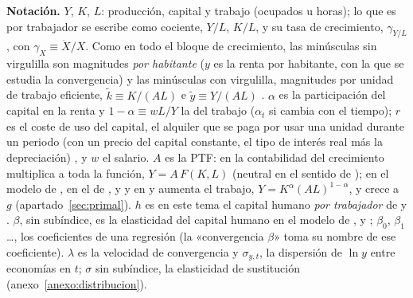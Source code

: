 \documentclass[11pt]{article}
\begin{document}
\begin{anotaciones}
\textbf{Notación.} $Y$, $K$, $L$: producción, capital y trabajo (ocupados u horas); lo que es por trabajador se escribe como cociente, $Y/L$, $K/L$, y su tasa de crecimiento, $\gamma_{Y/L}$, con $\gamma_X\equiv\dot X/X$. Como en todo el bloque de crecimiento, las minúsculas sin virgulilla son magnitudes \emph{por habitante} ($y$ es la renta por habitante, con la que se estudia la convergencia) y las minúsculas con virgulilla, magnitudes por unidad de trabajo eficiente, $\tilde k\equiv K/(AL)$ e $\tilde y\equiv Y/(AL)$ . $\alpha$ es la participación del capital en la renta y $1-\alpha\equiv wL/Y$ la del trabajo ($\alpha_t$ si cambia con el tiempo); $r$ es el coste de uso del capital, el alquiler que se paga por usar una unidad durante un periodo (con un precio del capital constante, el tipo de interés real más la depreciación) , y $w$ el salario. $A$ es la PTF: en la contabilidad del crecimiento multiplica a toda la función, $Y=A\,F(K,L)$ (neutral en el sentido de ); en el modelo de , en el de ,  y  y en  y  aumenta el trabajo, $Y=K^{\alpha}(AL)^{1-\alpha}$, y crece a $g$ (apartado~\ref{sec:primal}). $h$ es en este tema el capital humano \emph{por trabajador} de  y . $\beta$, sin subíndice, es la elasticidad del capital humano en el modelo de ,  y ; $\beta_0$, $\beta_1$\ldots, los coeficientes de una regresión (la «convergencia $\beta$» toma su nombre de ese coeficiente). $\lambda$ es la velocidad de convergencia y $\sigma_{y,t}$, la dispersión de $\ln y$ entre economías en $t$; $\sigma$ sin subíndice, la elasticidad de sustitución (anexo~\ref{anexo:distribucion}).
\end{anotaciones}
\end{document}
